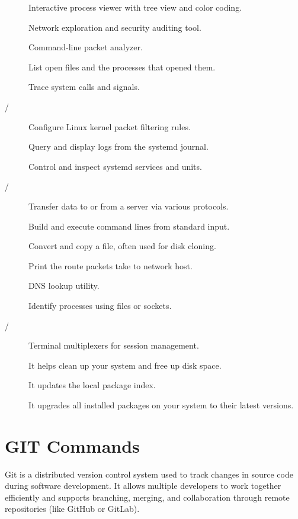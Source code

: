 \begin{description}
  \item[] Interactive process viewer with tree view and color coding.
  \item[] Network exploration and security auditing tool.
  \item[] Command-line packet analyzer.
  \item[] List open files and the processes that opened them.
  \item[] Trace system calls and signals.
  \item[/] Configure Linux kernel packet filtering rules.
  \item[] Query and display logs from the systemd journal.
  \item[] Control and inspect systemd services and units.
  \item[/] Transfer data to or from a server via various protocols.
  \item[] Build and execute command lines from standard input.
  \item[] Convert and copy a file, often used for disk cloning.
  \item[] Print the route packets take to network host.
  \item[] DNS lookup utility.
  \item[] Identify processes using files or sockets.
  \item[/] Terminal multiplexers for session management.
  \item[] It helps clean up your system and free up disk space.
  \item[] It updates the local package index.
  \item[] It upgrades all installed packages on your system to their latest versions.
\end{description}

\section{GIT Commands}

Git is a distributed version control system used to track changes in source code during software development. It allows multiple developers to work together efficiently and supports branching, merging, and collaboration through remote repositories (like GitHub or GitLab).

